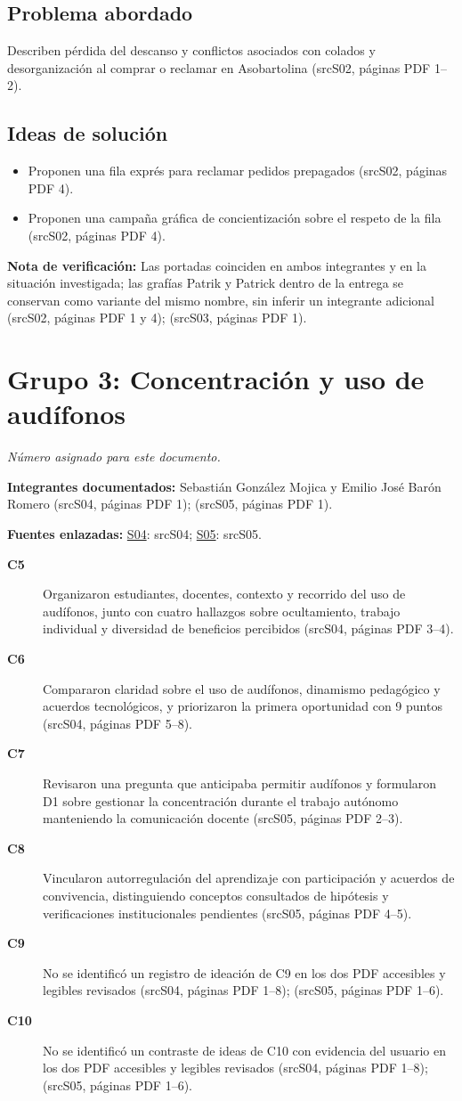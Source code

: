 \documentclass[11pt,a4paper]{article}
\newcommand{\evid}[2]{(\csname src#1\endcsname, páginas PDF #2)}
\begin{document}
\subsection*{Problema abordado}
Describen pérdida del descanso y conflictos asociados con colados y desorganización al comprar o reclamar en Asobartolina \evid{S02}{1--2}.
\subsection*{Ideas de solución}
\begin{itemize}
\item Proponen una fila exprés para reclamar pedidos prepagados \evid{S02}{4}.
\item Proponen una campaña gráfica de concientización sobre el respeto de la fila \evid{S02}{4}.
\end{itemize}
{\small\textbf{Nota de verificación:} Las portadas coinciden en ambos integrantes y en la situación investigada; las grafías Patrik y Patrick dentro de la entrega se conservan como variante del mismo nombre, sin inferir un integrante adicional \evid{S02}{1 y 4}; \evid{S03}{1}.}
\clearpage
\section*{Grupo 3: Concentración y uso de audífonos}
\textit{Número asignado para este documento.}

\textbf{Integrantes documentados:} Sebastián González Mojica y Emilio José Barón Romero \evid{S04}{1}; \evid{S05}{1}.

\textbf{Fuentes enlazadas:} \hyperlink{fuente-S04}{S04}: \csname srcS04\endcsname; \hyperlink{fuente-S05}{S05}: \csname srcS05\endcsname.

\begin{description}
\item[\textbf{C5}] Organizaron estudiantes, docentes, contexto y recorrido del uso de audífonos, junto con cuatro hallazgos sobre ocultamiento, trabajo individual y diversidad de beneficios percibidos \evid{S04}{3--4}.
\item[\textbf{C6}] Compararon claridad sobre el uso de audífonos, dinamismo pedagógico y acuerdos tecnológicos, y priorizaron la primera oportunidad con 9 puntos \evid{S04}{5--8}.
\item[\textbf{C7}] Revisaron una pregunta que anticipaba permitir audífonos y formularon D1 sobre gestionar la concentración durante el trabajo autónomo manteniendo la comunicación docente \evid{S05}{2--3}.
\item[\textbf{C8}] Vincularon autorregulación del aprendizaje con participación y acuerdos de convivencia, distinguiendo conceptos consultados de hipótesis y verificaciones institucionales pendientes \evid{S05}{4--5}.
\item[\textbf{C9}] No se identificó un registro de ideación de C9 en los dos PDF accesibles y legibles revisados \evid{S04}{1--8}; \evid{S05}{1--6}.
\item[\textbf{C10}] No se identificó un contraste de ideas de C10 con evidencia del usuario en los dos PDF accesibles y legibles revisados \evid{S04}{1--8}; \evid{S05}{1--6}.
\end{description}
\end{document}
